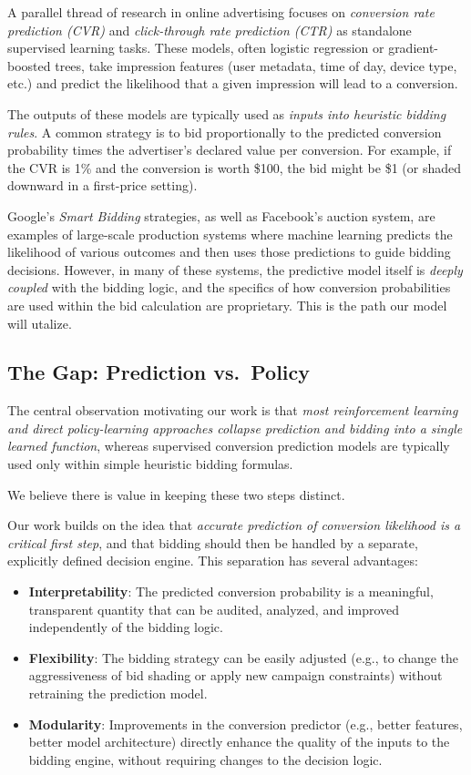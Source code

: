 \documentclass[11pt]{article}
\begin{document}
A parallel thread of research in online advertising focuses on \emph{conversion rate prediction (CVR)} and \emph{click-through rate prediction (CTR)} as standalone supervised learning tasks. These models, often logistic regression or gradient-boosted trees, take impression features (user metadata, time of day, device type, etc.) and predict the likelihood that a given impression will lead to a conversion.

The outputs of these models are typically used as \emph{inputs into heuristic bidding rules}. A common strategy is to bid proportionally to the predicted conversion probability times the advertiser's declared value per conversion. For example, if the CVR is 1\% and the conversion is worth \$100, the bid might be \$1 (or shaded downward in a first-price setting).

Google's \emph{Smart Bidding} strategies, as well as Facebook’s auction system, are examples of large-scale production systems where machine learning predicts the likelihood of various outcomes and then uses those predictions to guide bidding decisions. However, in many of these systems, the predictive model itself is \emph{deeply coupled} with the bidding logic, and the specifics of how conversion probabilities are used within the bid calculation are proprietary. This is the path our model will utalize.

\subsection{The Gap: Prediction vs.\ Policy}

The central observation motivating our work is that \emph{most reinforcement learning and direct policy-learning approaches collapse prediction and bidding into a single learned function}, whereas supervised conversion prediction models are typically used only within simple heuristic bidding formulas.

We believe there is value in keeping these two steps distinct.

Our work builds on the idea that \emph{accurate prediction of conversion likelihood is a critical first step}, and that bidding should then be handled by a separate, explicitly defined decision engine. This separation has several advantages:

\begin{itemize}
    \item \textbf{Interpretability}: The predicted conversion probability is a meaningful, transparent quantity that can be audited, analyzed, and improved independently of the bidding logic.
    \item \textbf{Flexibility}: The bidding strategy can be easily adjusted (e.g., to change the aggressiveness of bid shading or apply new campaign constraints) without retraining the prediction model.
    \item \textbf{Modularity}: Improvements in the conversion predictor (e.g., better features, better model architecture) directly enhance the quality of the inputs to the bidding engine, without requiring changes to the decision logic.
\end{itemize}
\end{document}

